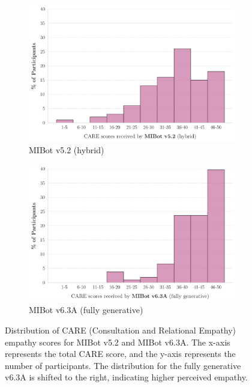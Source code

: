 \begin{figure}[htbp]
	\centering
	\begin{subfigure}[b]{0.48\textwidth}
		\centering
		\includegraphics[width=\textwidth]{fig/MIV5.2_care_scores_histogram.png}
		\caption{MIBot v5.2 (hybrid)}
		\label{fig:care_v5.2}
	\end{subfigure}
	\hfill
	\begin{subfigure}[b]{0.48\textwidth}
		\centering
		\includegraphics[width=\textwidth]{fig/2024-11-14-MIV6.3A-2024-11-22-MIV6.3A_care_scores_histogram.png}
		\caption{MIBot v6.3A (fully generative)}
		\label{fig:care_v6.3}
	\end{subfigure}
	\caption[CARE Score Distributions for MIBot v5.2 and v6.3A]{Distribution of CARE (Consultation and Relational Empathy) empathy scores for MIBot v5.2 and MIBot v6.3A. The x-axis represents the total CARE score, and the y-axis represents the number of participants. The distribution for the fully generative v6.3A is shifted to the right, indicating higher perceived empathy.}
	\label{fig:care_distributions}
\end{figure}

